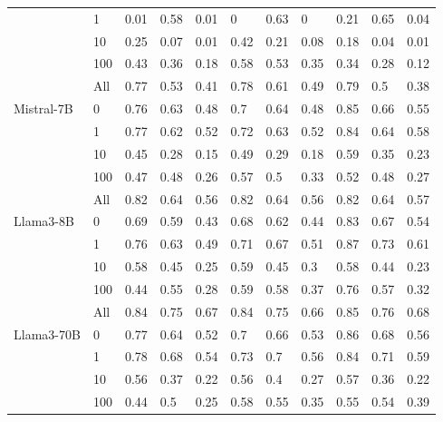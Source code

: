 \begin{table}
\begin{tabular}[t]{llll>{}l|ll>{}l|lll}
 & 1 & 0.01 & 0.58 & 0.01 & 0 & 0.63 & 0 & 0.21 & 0.65 & 0.04\\

 & 10 & 0.25 & 0.07 & 0.01 & 0.42 & 0.21 & 0.08 & 0.18 & 0.04 & 0.01\\

 & 100 & 0.43 & 0.36 & 0.18 & 0.58 & 0.53 & 0.35 & 0.34 & 0.28 & 0.12\\

 & All & 0.77 & 0.53 & 0.41 & 0.78 & 0.61 & 0.49 & 0.79 & 0.5 & 0.38\\
\cmidrule{1-11}
Mistral-7B & 0 & 0.76 & 0.63 & 0.48 & 0.7 & 0.64 & 0.48 & 0.85 & 0.66 & 0.55\\

 & 1 & 0.77 & 0.62 & 0.52 & 0.72 & 0.63 & 0.52 & 0.84 & 0.64 & 0.58\\

 & 10 & 0.45 & 0.28 & 0.15 & 0.49 & 0.29 & 0.18 & 0.59 & 0.35 & 0.23\\

 & 100 & 0.47 & 0.48 & 0.26 & 0.57 & 0.5 & 0.33 & 0.52 & 0.48 & 0.27\\

 & All & 0.82 & 0.64 & 0.56 & 0.82 & 0.64 & 0.56 & 0.82 & 0.64 & 0.57\\
\cmidrule{1-11}
Llama3-8B & 0 & 0.69 & 0.59 & 0.43 & 0.68 & 0.62 & 0.44 & 0.83 & 0.67 & 0.54\\

 & 1 & 0.76 & 0.63 & 0.49 & 0.71 & 0.67 & 0.51 & 0.87 & 0.73 & 0.61\\

 & 10 & 0.58 & 0.45 & 0.25 & 0.59 & 0.45 & 0.3 & 0.58 & 0.44 & 0.23\\

 & 100 & 0.44 & 0.55 & 0.28 & 0.59 & 0.58 & 0.37 & 0.76 & 0.57 & 0.32\\

 & All & 0.84 & 0.75 & 0.67 & 0.84 & 0.75 & 0.66 & 0.85 & 0.76 & 0.68\\
\cmidrule{1-11}
Llama3-70B & 0 & 0.77 & 0.64 & 0.52 & 0.7 & 0.66 & 0.53 & 0.86 & 0.68 & 0.56\\

 & 1 & 0.78 & 0.68 & 0.54 & 0.73 & 0.7 & 0.56 & 0.84 & 0.71 & 0.59\\

 & 10 & 0.56 & 0.37 & 0.22 & 0.56 & 0.4 & 0.27 & 0.57 & 0.36 & 0.22\\

 & 100 & 0.44 & 0.5 & 0.25 & 0.58 & 0.55 & 0.35 & 0.55 & 0.54 & 0.39\\


\end{tabular}
\end{table}
